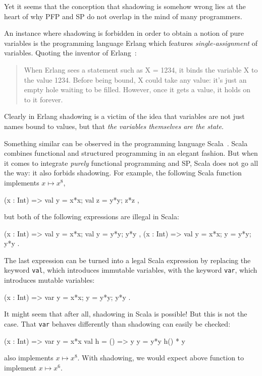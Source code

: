 \documentclass{llncs}
\newcommand{\bsrc}[1] {\lstinline!#1!}
\begin{document}
Yet it seems that the conception that shadowing is somehow wrong lies at the heart of why PFP and SP do not overlap in the mind of many programmers. 

An instance where shadowing is forbidden in order to obtain a notion of pure variables is the programming language Erlang which features \emph{single-assignment} of variables. Quoting the inventor of Erlang~\cite[p. 29]{erlang}: 
\begin{quote}
When Erlang sees a statement such as X = 1234, it binds the variable X to the value 1234. Before being bound, X could take any value: it's just an empty hole waiting to be filled. However, once it gets a value, it holds on to it forever.
\end{quote}
Clearly in Erlang shadowing is a victim of the idea that variables are not just names bound to values, but that \emph{the variables themselves are the state}.

Something similar can be observed in the programming language Scala~\cite{scala}. Scala combines functional and structured programming in an elegant fashion. But when it comes to integrate \emph{purely} functional programming and SP, Scala does not go all the way: it also forbids shadowing. For example, the following Scala function implements $x \mapsto x^8$,
\begin{babellisting}
(x : Int) => { val y = x*x; val z = y*y; z*z },
\end{babellisting}
but both of the following expressions are illegal in Scala:
\begin{babellisting}
(x : Int) => { val y = x*x; val y = y*y; y*y },
(x : Int) => { val y = x*x; y = y*y; y*y }.
\end{babellisting}
The last expression can be turned into a legal Scala expression by replacing the keyword \bsrc{val}, which introduces immutable variables, with the keyword \bsrc{var}, which introduces mutable variables:
\begin{babellisting}
(x : Int) => { var y = x*x; y = y*y; y*y }.
\end{babellisting}
It might seem that after all, shadowing in Scala is possible! But this is not the case. That \bsrc{var}
behaves differently than shadowing can easily be checked:
\begin{babellisting}
(x : Int) => {  var y = x*x
                val h = () => y
                y = y*y
                h() * y  }
\end{babellisting}
also implements $x \mapsto x^8$. With shadowing, we would expect above function to implement $x \mapsto x^6$.
\end{document}

